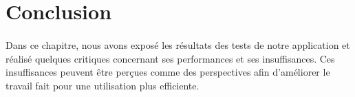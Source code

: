 	      
    \section*{Conclusion}
	  \paragraph{}
		  Dans ce chapitre, nous avons exposé les résultats des tests de notre application et réalisé quelques critiques concernant ses performances et ses insuffisances. Ces insuffisances peuvent être perçues comme des perspectives afin d'améliorer le travail fait pour une utilisation plus efficiente.